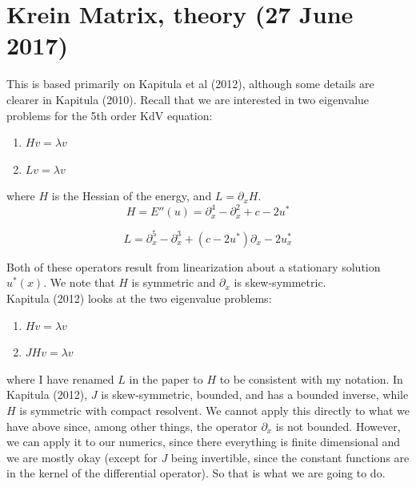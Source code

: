 \documentclass[12pt]{article}
\begin{document}
\section{Krein Matrix, theory (27 June 2017)}

This is based primarily on Kapitula et al (2012), although some details are clearer in Kapitula (2010). Recall that we are interested in two eigenvalue problems for the 5th order KdV equation:

\begin{enumerate}\label{eigenvalueproblems}
	\item $H v = \lambda v$
	\item $L v = \lambda v$
\end{enumerate}

where $H$ is the Hessian of the energy, and $L = \partial_x H$. 
\begin{equation}\label{linear4th}
H = E''(u) = \partial_x^4 - \partial_x^2 + c - 2 u^*
\end{equation}

\begin{equation}\label{linear5th}
L = \partial_x^5 - \partial_x^3 + (c - 2 u^*) \partial_x - 2 u^*_x
\end{equation}

Both of these operators result from linearization about a stationary solution $u^*(x)$. We note that $H$ is symmetric and $\partial_x$ is skew-symmetric.\\

Kapitula (2012) looks at the two eigenvalue problems:

\begin{enumerate}
	\item $H v = \lambda v$
	\item $J H v = \lambda v$
\end{enumerate}

where I have renamed $L$ in the paper to $H$ to be consistent with my notation. In Kapitula (2012), $J$ is skew-symmetric, bounded, and has a bounded inverse, while $H$ is symmetric with compact resolvent. We cannot apply this directly to what we have above since, among other things, the operator $\partial_x$ is not bounded. However, we can apply it to our numerics, since there everything is finite dimensional and we are mostly okay (except for $J$ being invertible, since the constant functions are in the kernel of the differential operator). So that is what we are going to do.\\
\end{document}
